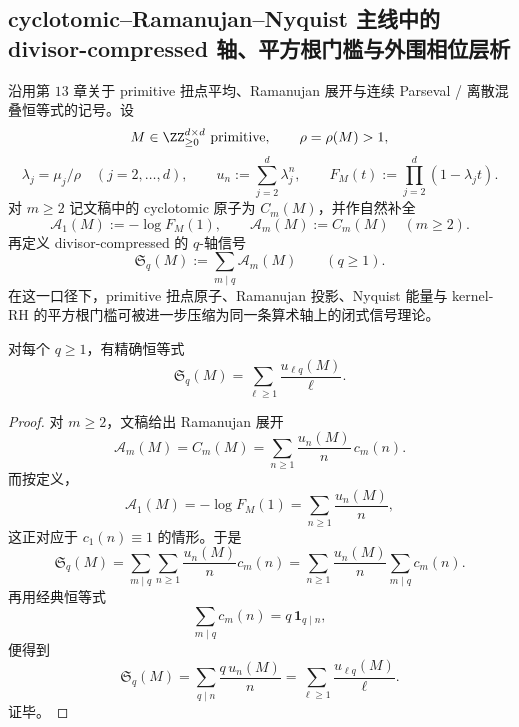 \subsection{cyclotomic--Ramanujan--Nyquist 主线中的 divisor-compressed 轴、平方根门槛与外围相位层析}\label{subsec:conclusion-cyclotomic-ramanujan-nyquist-divisoraxis}
沿用第 \(13\) 章关于 primitive 扭点平均、Ramanujan 展开与连续 Parseval / 离散混叠恒等式的记号。设
\[
M\in \ZZ_{\ge 0}^{d\times d}\ \text{primitive},\qquad
\rho=\rho(M)>1,
\]
\[
\lambda_j=\mu_j/\rho\quad (j=2,\dots,d),\qquad
u_n:=\sum_{j=2}^d \lambda_j^n,\qquad
F_M(t):=\prod_{j=2}^d(1-\lambda_j t).
\]
对 \(m\ge 2\) 记文稿中的 cyclotomic 原子为 \(C_m(M)\)，并作自然补全
\[
\mathcal A_1(M):=-\log F_M(1),\qquad
\mathcal A_m(M):=C_m(M)\quad (m\ge 2).
\]
再定义 divisor-compressed 的 \(q\)-轴信号
\[
\mathfrak S_q(M):=\sum_{m\mid q}\mathcal A_m(M)\qquad (q\ge 1).
\]
在这一口径下，primitive 扭点原子、Ramanujan 投影、Nyquist 能量与 kernel-RH 的平方根门槛可被进一步压缩为同一条算术轴上的闭式信号理论。

\begin{theorem}\label{thm:conclusion-divisor-compressed-qaxis-ramanujan-diagonalization}
对每个 \(q\ge 1\)，有精确恒等式
\[
\mathfrak S_q(M)=\sum_{\ell\ge 1}\frac{u_{\ell q}(M)}{\ell}.
\]
\end{theorem}
\begin{proof}
对 \(m\ge 2\)，文稿给出 Ramanujan 展开
\[
\mathcal A_m(M)=C_m(M)=\sum_{n\ge 1}\frac{u_n(M)}{n}\,c_m(n).
\]
而按定义，
\[
\mathcal A_1(M)=-\log F_M(1)=\sum_{n\ge 1}\frac{u_n(M)}{n},
\]
这正对应于 \(c_1(n)\equiv 1\) 的情形。于是
\[
\mathfrak S_q(M)
=\sum_{m\mid q}\sum_{n\ge 1}\frac{u_n(M)}{n}c_m(n)
=\sum_{n\ge 1}\frac{u_n(M)}{n}\sum_{m\mid q}c_m(n).
\]
再用经典恒等式
\[
\sum_{m\mid q}c_m(n)=q\,\mathbf 1_{q\mid n},
\]
便得到
\[
\mathfrak S_q(M)
=\sum_{q\mid n}\frac{q\,u_n(M)}{n}
=\sum_{\ell\ge 1}\frac{u_{\ell q}(M)}{\ell}.
\]
证毕。
\end{proof}


